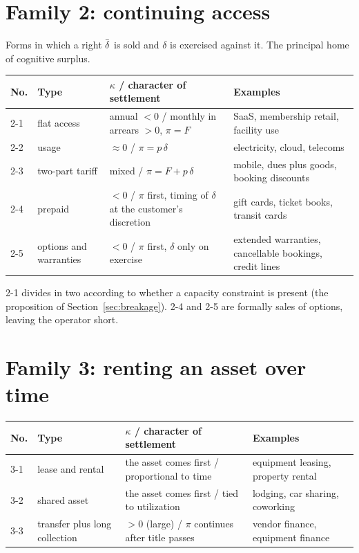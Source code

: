 \section{Family 2: continuing access}

Forms in which a right $\dbar$ is sold and $\delta$ is exercised against it. The principal
home of cognitive surplus.

\begin{center}
\begin{tabularx}{\textwidth}{@{}llXX@{}}
\toprule
No. & Type & $\kappa$ / character of settlement & Examples \\
\midrule
2-1 & flat access & annual $<0$ / monthly in arrears $>0$, $\pi=F$ & SaaS, membership retail, facility use \\
2-2 & usage & $\approx 0$ / $\pi = p\,\delta$ & electricity, cloud, telecoms \\
2-3 & two-part tariff & mixed / $\pi = F + p\,\delta$ & mobile, dues plus goods, booking discounts \\
2-4 & prepaid & $<0$ / $\pi$ first, timing of $\delta$ at the customer's discretion & gift cards, ticket books, transit cards \\
2-5 & options and warranties & $<0$ / $\pi$ first, $\delta$ only on exercise & extended warranties, cancellable bookings, credit lines \\
\bottomrule
\end{tabularx}
\label{tab:family-2-catalog}
\end{center}

2-1 divides in two according to whether a capacity constraint is present (the proposition of
Section~\ref{sec:breakage}). 2-4 and 2-5 are formally sales of options, leaving the operator
short.

\section{Family 3: renting an asset over time}

\begin{center}
\begin{tabularx}{\textwidth}{@{}llXX@{}}
\toprule
No. & Type & $\kappa$ / character of settlement & Examples \\
\midrule
3-1 & lease and rental & the asset comes first / proportional to time & equipment leasing, property rental \\
3-2 & shared asset & the asset comes first / tied to utilization & lodging, car sharing, coworking \\
3-3 & transfer plus long collection & $>0$ (large) / $\pi$ continues after title passes & vendor finance, equipment finance \\
\bottomrule
\end{tabularx}
\label{tab:family-3-catalog}
\end{center}

